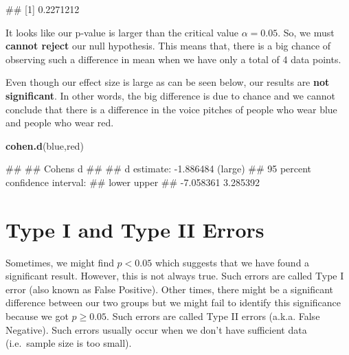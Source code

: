 \documentclass[
]{book}
\newenvironment{Shaded}{\begin{snugshade}}{\end{snugshade}}
\newcommand{\FunctionTok}[1]{\textcolor[rgb]{0.13,0.29,0.53}{\textbf{#1}}}
\newcommand{\NormalTok}[1]{#1}
\begin{document}
\begin{Shaded}
\begin{Highlighting}[]
\NormalTok{\#\# [1] 0.2271212}
\end{Highlighting}
\end{Shaded}

It looks like our p-value is larger than the critical value \(\alpha = 0.05\). So, we must \textbf{cannot reject} our null hypothesis. This means that, there is a big chance of observing such a difference in mean when we have only a total of 4 data points.

Even though our effect size is large as can be seen below, our results are \textbf{not significant}. In other words, the big difference is due to chance and we cannot conclude that there is a difference in the voice pitches of people who wear blue and people who wear red.

\begin{Shaded}
\begin{Highlighting}[]
\FunctionTok{cohen.d}\NormalTok{(blue,red)}
\end{Highlighting}
\end{Shaded}

\begin{Shaded}
\begin{Highlighting}[]
\NormalTok{\#\# }
\NormalTok{\#\# Cohen\textquotesingle{}s d}
\NormalTok{\#\# }
\NormalTok{\#\# d estimate: {-}1.886484 (large)}
\NormalTok{\#\# 95 percent confidence interval:}
\NormalTok{\#\#     lower     upper }
\NormalTok{\#\# {-}7.058361  3.285392}
\end{Highlighting}
\end{Shaded}

\hypertarget{type-i-and-type-ii-errors}{%
\section{Type I and Type II Errors}\label{type-i-and-type-ii-errors}}

Sometimes, we might find \(p < 0.05\) which suggests that we have found a significant result. However, this is not always true. Such errors are called Type I error (also known as False Positive). Other times, there might be a significant difference between our two groups but we might fail to identify this significance because we got \(p \geq 0.05\). Such errors are called Type II errors (a.k.a. False Negative). Such errors usually occur when we don't have sufficient data (i.e.~sample size is too small).
\end{document}
